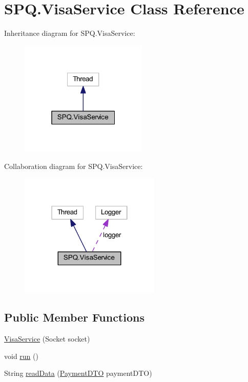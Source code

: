 \hypertarget{class_s_p_q_1_1_visa_service}{}\section{S\+P\+Q.\+Visa\+Service Class Reference}
\label{class_s_p_q_1_1_visa_service}


Inheritance diagram for S\+P\+Q.\+Visa\+Service\+:
\nopagebreak
\begin{figure}[H]
\begin{center}
\leavevmode
\includegraphics[width=172pt]{class_s_p_q_1_1_visa_service__inherit__graph}
\end{center}
\end{figure}


Collaboration diagram for S\+P\+Q.\+Visa\+Service\+:
\nopagebreak
\begin{figure}[H]
\begin{center}
\leavevmode
\includegraphics[width=190pt]{class_s_p_q_1_1_visa_service__coll__graph}
\end{center}
\end{figure}
\subsection*{Public Member Functions}
\begin{DoxyCompactItemize}
\item 
\mbox{\hyperlink{class_s_p_q_1_1_visa_service_a18a0c5b945cf8164f1069230db5ddc91}{Visa\+Service}} (Socket socket)
\item 
void \mbox{\hyperlink{class_s_p_q_1_1_visa_service_a4e9434dfb98d1ff247d29794ac96909e}{run}} ()
\item 
String \mbox{\hyperlink{class_s_p_q_1_1_visa_service_a9f06022375e8bd98b78a8268bdc4ff05}{read\+Data}} (\mbox{\hyperlink{class_s_p_q_1_1dto_1_1_payment_d_t_o}{Payment\+D\+TO}} payment\+D\+TO)
\end{DoxyCompactItemize}


